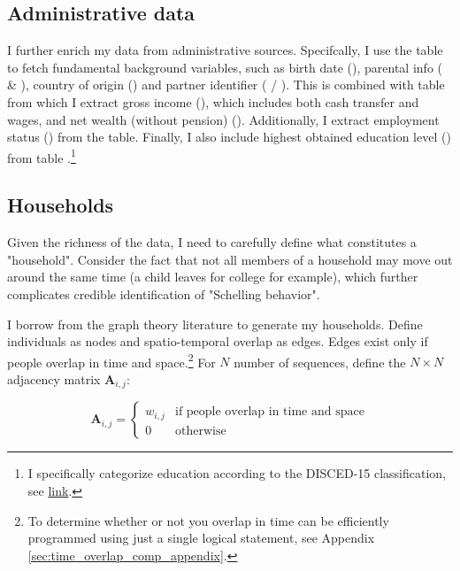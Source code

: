 \documentclass[main.tex]{subfiles}
\begin{document}
\subsection{Administrative data}
I further enrich my data from administrative sources. Specifcally, I use the table  to fetch fundamental background variables, such as birth date (), parental info ( \& ), country of origin () and partner identifier ( / ). This is combined with table  from which I extract gross income (), which includes both cash transfer and wages, and net wealth (without pension) (\textcolor{red}{}). Additionally, I extract employment status () from the  table. Finally, I also include highest obtained education level () from table .\footnote{I specifically categorize education according to the DISCED-15 classification, see \href{https://www.dst.dk/da/Statistik/dokumentation/nomenklaturer/disced15-audd}{link}.}

\subsection{Households}
Given the richness of the data, I need to carefully define what constitutes a "household". Consider the fact that not all members of a household may move out around the same time (a child leaves for college for example), which further complicates credible identification of "Schelling behavior".

I borrow from the graph theory literature to generate my households. Define individuals as nodes and spatio-temporal overlap as edges. Edges exist only if people overlap in time and space.\footnote{To determine whether or not you overlap in time can be efficiently programmed using just a single logical statement, see Appendix \ref{sec:time_overlap_comp_appendix}.} For $N$ number of sequences, define the $N \times N$ adjacency matrix $\mathbf{A}_{i,j}$:

\begin{equation}
    \mathbf{A}_{i,j} = \begin{cases}
        w_{i,j} & \text{if people overlap in time and space} \\
        0 & \text{otherwise}
    \end{cases}
\end{equation}
\end{document}
